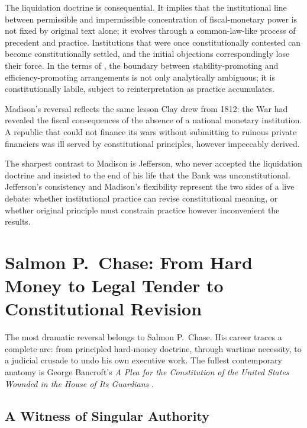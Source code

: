 \documentclass[12pt]{article}
\begin{document}
The liquidation doctrine is consequential.  It implies
that the institutional line between permissible and impermissible
concentration of fiscal-monetary power is not fixed by original text
alone; it evolves through a common-law-like process of precedent and
practice.  Institutions that were once constitutionally contested can
become constitutionally settled, and the initial objections correspondingly
lose their force.  In the terms of \citet{Sargent2011}, the boundary
between stability-promoting and efficiency-promoting arrangements is not
only analytically ambiguous; it is constitutionally labile, subject to
reinterpretation as practice accumulates.

Madison's reversal reflects the same lesson Clay drew from 1812:
the War had revealed the fiscal consequences of the absence of a national
monetary institution.  A republic that could not finance its wars
without submitting to ruinous private financiers was ill served by
constitutional principles, however impeccably derived.

The sharpest contrast to Madison is Jefferson, who never accepted the
liquidation doctrine and insisted to the end of his life that the Bank was
unconstitutional.  Jefferson's consistency and Madison's flexibility
represent the two sides of a live debate: whether institutional practice
can revise constitutional meaning, or whether original principle must
constrain practice however inconvenient the results.


\section{Salmon P.~Chase: From Hard Money to Legal Tender to
         Constitutional Revision}

The most dramatic reversal belongs
to Salmon P.\ Chase.  His career traces a complete arc: from principled
hard-money doctrine, through wartime necessity, to a judicial crusade to
undo his own executive work.  The fullest contemporary anatomy is George
Bancroft's \textit{A Plea for the Constitution of the United States
Wounded in the House of Its Guardians} \citep{Bancroft1886}.

\subsection{A Witness of Singular Authority}
\end{document}
